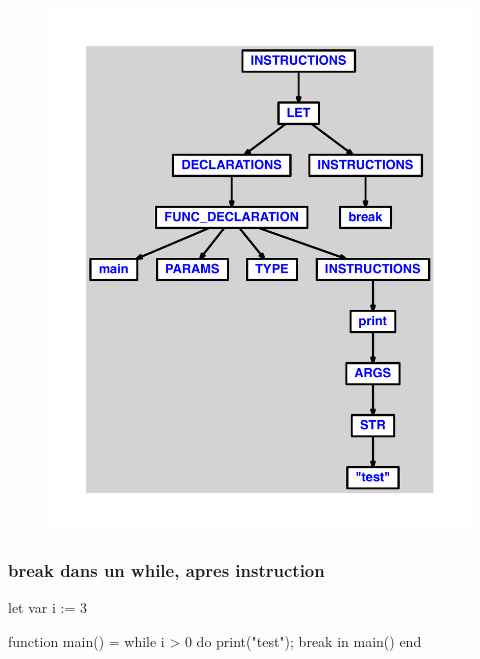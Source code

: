 \documentclass{article}
\begin{document}
\begin{figure}[H]\centering\includegraphics[max width=\textwidth]{ast/ast_13.pdf}\end{figure}\subsubsection{break dans un while, apres instruction}
\begin{verbatimtab}
let
	var i := 3

	function main() =
		while i > 0 do
			print("test");
			break
in main() end
\end{verbatimtab}
\end{document}
